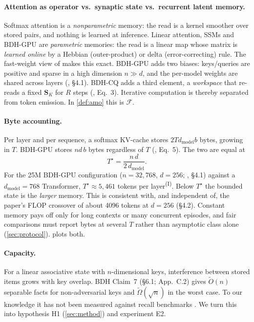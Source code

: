 \documentclass[11pt]{article}
\theoremstyle{remark}
\newcommand{\Sm}{\mathbf{S}}
\newcommand{\IN}{\textsuperscript{(I)}}
\begin{document}
\paragraph{Attention as operator vs.\ synaptic state vs.\ recurrent latent memory.}
Softmax attention is a \emph{nonparametric} memory: the read is a kernel smoother over stored pairs, and nothing
is learned at inference. Linear attention, SSMs and BDH-GPU are \emph{parametric} memories: the read is a linear
map whose matrix is \emph{learned online} by a Hebbian (outer-product) or delta (error-correcting) rule. The
fast-weight view of \citet{schlag2021linear} makes this exact. BDH-GPU adds two biases: keys/queries are positive
and sparse in a high dimension $n\gg d$, and the per-model weights are shared across layers
(\citealp{kosowski2025bdh}, \S4.1). BDH-CQ adds a third element, a \emph{workspace} that re-reads a fixed
$\Sm_K$ for $R$ steps (\citealp{engdahl2026bdhcq}, Eq.~3). Iterative computation is thereby separated from token
emission. In \cref{def:amo} this is $\mathcal{F}$.

\paragraph{Byte accounting.} Per layer and per sequence, a softmax KV-cache stores $2Td_{\text{model}}b$ bytes,
growing in $T$. BDH-GPU stores $n d\, b$ bytes regardless of $T$ (\citealp{kosowski2025bdh}, Eq.~5). The two are
equal at
\begin{equation}
T^\star=\frac{n\,d}{2\,d_{\text{model}}}.
\label{eq:crossover}
\end{equation}
For the 25M BDH-GPU configuration ($n=32{,}768$, $d=256$; \citealp{kosowski2025bdh}, \S4.1) against a
$d_{\text{model}}=768$ Transformer, $T^\star\approx5{,}461$ tokens per layer\IN. Below $T^\star$ the bounded state
is the \emph{larger} memory. This is consistent with, and independent of, the paper's FLOP crossover of about 4096
tokens at $d=256$ (\S4.2). Constant memory pays off only for long contexts or many concurrent episodes, and fair
comparisons must report bytes at several $T$ rather than asymptotic class alone (\cref{sec:protocol}).  plots both.



\paragraph{Capacity.} For a linear associative state with $n$-dimensional keys, interference between stored
items grows with key overlap. BDH Claim~7 (\S6.1; App.~C.2) gives $\tilde O(n)$ separable facts for
non-adversarial keys and $\tilde\Omega(\sqrt n)$ in the worst case. To our knowledge it has not been measured
against recall benchmarks \citep{arora2023zoology}. We turn this into hypothesis H1 (\cref{sec:method}) and
experiment E2.
\end{document}
